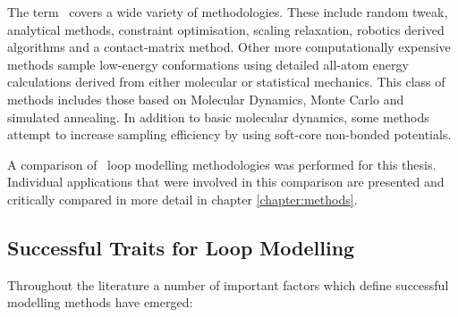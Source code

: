 The term \abinitio\ covers a wide variety of methodologies.  These include random tweak\cite{METHOD:Xia2002,METHOD:AntibodyB,METHOD:Antibody}, analytical methods\cite{METHOD:Kinematic,METHOD:Wed99,METHOD:DivideConquer}, constraint optimisation\cite{METHOD:RapperB}, scaling relaxation\cite{METHOD:Zhe94}, robotics derived algorithms\cite{METHOD:Robotics} and a contact-matrix method\cite{METHOD:Gal2001}. Other more computationally expensive methods sample low-energy conformations using detailed all-atom energy calculations derived from either molecular or statistical mechanics. This class of methods includes those based on Molecular Dynamics\cite{METHOD:Bru87}, Monte Carlo\cite{METHOD:Abagyan94,METHOD:Zha97}  and simulated annealing\cite{METHOD:Fis2000}. In addition to basic molecular dynamics, some methods attempt to increase sampling efficiency by using soft-core non-bonded potentials\cite{METHOD:Levitt1983,METHOD:Tappura2001}. 

A comparison of \abinitio\ loop modelling methodologies was performed
for this thesis. Individual applications that were involved in this comparison
are presented and critically compared in more detail in chapter \ref{chapter:methods}. 

\subsection{Successful Traits for Loop Modelling}

Throughout the literature a number of important factors which define successful modelling methods have emerged:

